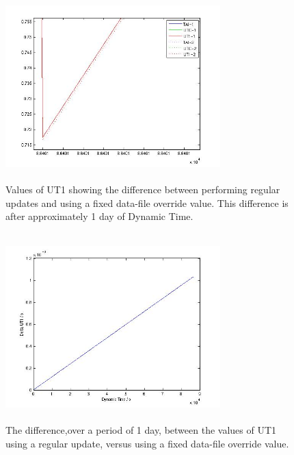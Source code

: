 \begin{description}
\begin{figure}[htp]
\end{figure}
\begin{figure}[htp]
\begin{center}
\includegraphics[width=3.2736in,height=2.85in]{figures/sim4_ut1_end.jpg}
\caption{Values of UT1 showing the difference between performing regular updates and using a fixed data-file override value.  This difference is after approximately 1 day of Dynamic Time.}\label{fig:sim4ut1}
\end{center}

\end{figure}
\begin{figure}[htp]
\begin{center}
\includegraphics[width=3.2736in,height=2.85in]{figures/sim4_deltaut1.jpg}
\caption{The difference,over a period of 1 day, between the values of UT1 using a regular update, versus using a fixed data-file override value.}\label{fig:sim4dut1}
\end{center}
\end{figure}
\end{description}

\clearpage

